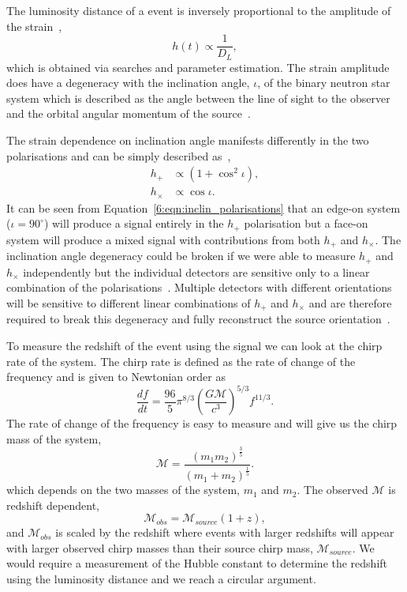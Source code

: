The luminosity distance of a \gwadj event is inversely proportional to the amplitude of the \gwadj strain~\cite{Schutz:1986},%
\begin{equation}
    h(t) \propto \frac{1}{D_{L}} , 
\end{equation}
%
which is obtained via \gwadj searches and parameter estimation. The \gwadj strain amplitude does have a degeneracy with the inclination angle, $\iota$, of the binary neutron star system which is described as the angle between the line of sight to the observer and the orbital angular momentum of the source~\cite{inclin_degen_2:2019}.

The \gwadj strain dependence on inclination angle manifests differently in the two \gwadj polarisations and can be simply described as~\cite{inclin_degen:2018},
%
\begin{align}
    h_{+} &\propto \left(1+\cos^{2}\iota\right), \\
    h_{\times} &\propto \cos\iota .
    \label{6:eqn:inclin_polarisations}
\end{align}
%
It can be seen from Equation~\ref{6:eqn:inclin_polarisations} that an edge-on system ($\iota = 90^{\circ}$) will produce a signal entirely in the $h_{+}$ polarisation but a face-on system will produce a mixed signal with contributions from both $h_{+}$ and $h_{\times}$. The inclination angle degeneracy could be broken if we were able to measure $h_{+}$ and $h_{\times}$ independently but the individual \gwadj detectors are sensitive only to a linear combination of the polarisations~\cite{aLIGO:2015}. Multiple \gwadj detectors with different orientations will be sensitive to different linear combinations of $h_{+}$ and $h_{\times}$ and are therefore required to break this degeneracy and fully reconstruct the source orientation~\cite{inclin_degen_2:2019}.

To measure the redshift of the event using the \gwadj signal we can look at the chirp rate of the system. The chirp rate is defined as the rate of change of the \gwadj frequency and is given to Newtonian order as~\cite{Jaranowski:2009}
%
\begin{equation}
    \frac{df}{dt} = \frac{96}{5} \pi^{8/3} \left(\frac{G\mathcal{M}}{c^{3}}\right)^{5/3} f^{11/3}.
    \label{6:eq:chirp_rate}
\end{equation}
%
The rate of change of the \gwadj frequency is easy to measure and will give us the chirp mass of the system,
%
\begin{equation}
    \mathcal{M} = \frac{(m_1 m_2)^{\frac{3}{5}}}{(m_1 + m_2)^{\frac{1}{5}}}.
    \label{6:eq:mchirp}
\end{equation}
%
which depends on the two masses of the system, $m_{1}$ and $m_{2}$. The observed $\mathcal{M}$ is redshift dependent,
%
\begin{equation}
    \mathcal{M}_{obs} = \mathcal{M}_{source}(1 + z), 
    \label{6:eq:mchirp_obs}
\end{equation}
and $\mathcal{M}_{obs}$ is scaled by the redshift where events with larger redshifts will appear with larger observed chirp masses than their source chirp mass, $\mathcal{M}_{source}$. We would require a measurement of the Hubble constant to determine the redshift using the luminosity distance and we reach a circular argument.

